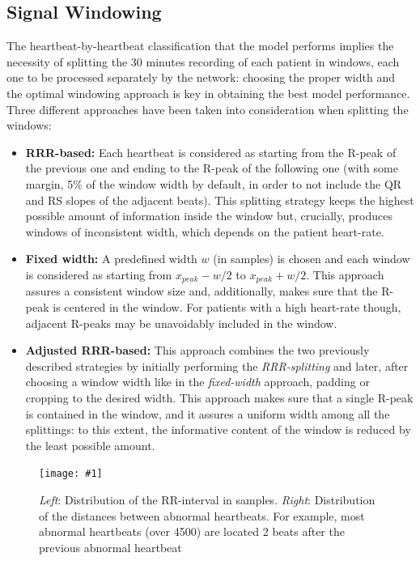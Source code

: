 \documentclass[conference]{IEEEtran}
\newcommand{\addfigure}[3]{
    \begin{figure}
        \texttt{[image: \#1]}
        \caption{#2}
        \label{#3}
    \end{figure}
}
\begin{document}
    

\subsection{Signal Windowing}
    The heartbeat-by-heartbeat classification that the model performs implies the
    necessity of splitting the 30 minutes recording of each patient in windows, each
    one to be processed separately by the network:
    choosing the proper width and the optimal windowing approach is key in
    obtaining the best model performance. Three different approaches have been taken
    into consideration when splitting the windows:
    \begin{itemize}
        \item \textbf{RRR-based: }Each heartbeat is considered as starting from
        the R-peak of the previous one and ending to the R-peak of the
        following one (with some margin, 5\% of the window width by default, in
        order to not include the QR and RS
        slopes of the adjacent beats). This splitting strategy keeps the highest
        possible amount of information inside the
        window but, crucially,
        produces windows of inconsistent width, which depends on the patient
        heart-rate.
        \item \textbf{Fixed width: }A predefined width $w$ (in samples) is
        chosen and each window is considered as starting from $x_{peak}-w/2$ to
        $x_{peak}+w/2$. This approach assures a consistent window size and,
        additionally, makes sure that the R-peak is centered in the window. For
        patients with a high heart-rate though, adjacent R-peaks may be
        unavoidably included in the window.
        \item \textbf{Adjusted RRR-based: }This approach combines the two
        previously described strategies by initially performing the \textit{RRR-splitting} and
        later, after choosing a window width like in the
        \textit{fixed-width} approach, padding or cropping to the desired width.
        This approach makes sure that a single R-peak is contained in the
        window, and it assures a uniform width among all the splittings:
        to this extent, the informative content of the window is reduced by the
        least possible amount. 
    \end{itemize}

    \addfigure
        {img/histograms.jpg}
        {\textit{Left}: Distribution of the RR-interval in samples.
        \textit{Right}: Distribution of the distances between abnormal
        heartbeats. For example, most abnormal heartbeats (over 4500) are
        located 2 beats after the previous abnormal heartbeat }
        {fig:hists}
\end{document}
